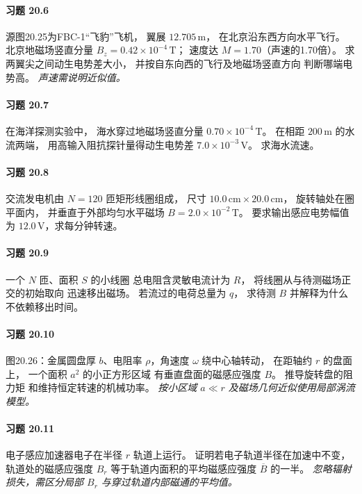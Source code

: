 \paragraph{习题 20.6}
源图20.25为FBC-1“飞豹”飞机，
翼展 \(12.705\,\mathrm m\)，
在北京沿东西方向水平飞行。
北京地磁场竖直分量
\(B_z=0.42\times10^{-4}\,\mathrm T\)；
速度达 \(M=1.70\)（声速的1.70倍）。
求两翼尖之间动生电势差大小，
并按自东向西的飞行及地磁场竖直方向
判断哪端电势高。
\textit{声速需说明近似值。}

\paragraph{习题 20.7}
在海洋探测实验中，
海水穿过地磁场竖直分量
\(0.70\times10^{-4}\,\mathrm T\)。
在相距 \(200\,\mathrm m\) 的水流两端，
用高输入阻抗探针量得动生电势差
\(7.0\times10^{-3}\,\mathrm V\)。
求海水流速。

\paragraph{习题 20.8}
交流发电机由 \(N=120\) 匝矩形线圈组成，
尺寸 \(10.0\,\mathrm{cm}\times20.0\,\mathrm{cm}\)，
旋转轴处在圈平面内，
并垂直于外部均匀水平磁场
\(B=2.0\times10^{-2}\,\mathrm T\)。
要求输出感应电势幅值为
\(12.0\,\mathrm V\)，求每分钟转速。

\paragraph{习题 20.9}
一个 \(N\) 匝、面积 \(S\) 的小线圈
总电阻含灵敏电流计为 \(R\)，
将线圈从与待测磁场正交的初始取向
迅速移出磁场。
若流过的电荷总量为 \(q\)，
求待测 \(B\) 并解释为什么不依赖移出时间。

\paragraph{习题 20.10}
图20.26：金属圆盘厚 \(b\)、电阻率
\(\rho\)，角速度 \(\omega\) 绕中心轴转动，
在距轴约 \(r\) 的盘面上，
一个面积 \(a^2\) 的小正方形区域
有垂直盘面的磁感应强度 \(B\)。
推导旋转盘的阻力矩
和维持恒定转速的机械功率。
\textit{按小区域 \(a\ll r\)
及磁场几何近似使用局部涡流模型。}

\paragraph{习题 20.11}
电子感应加速器电子在半径 \(r\) 轨道上运行。
证明若电子轨道半径在加速中不变，
轨道处的磁感应强度 \(B_r\)
等于轨道内面积的平均磁感应强度
\(\overline B\) 的一半。
\textit{忽略辐射损失，需区分局部 \(B_r\)
与穿过轨道内部磁通的平均值。}

